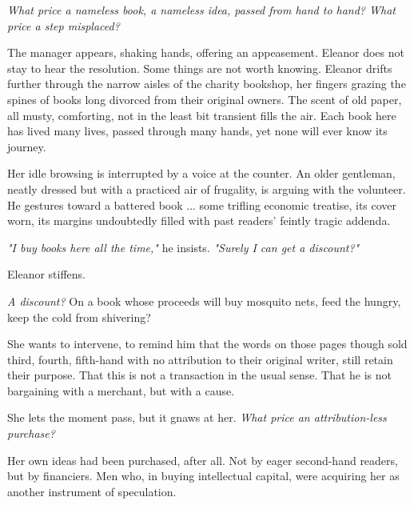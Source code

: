 \smallskip

\textit{What price a nameless book, a nameless idea, passed from hand to hand? What price a step misplaced?}

\smallskip

The manager appears, shaking hands, offering an appeasement. Eleanor does not stay to hear the resolution. Some things are not worth knowing. Eleanor drifts further through the narrow aisles of the charity bookshop, her fingers grazing the spines of books long divorced from their original owners. The scent of old paper, all musty, comforting, not in the least bit transient fills the air. Each book here has lived many lives, passed through many hands, yet none will ever know its journey.

\smallskip

Her idle browsing is interrupted by a voice at the counter. An older gentleman, neatly dressed but with a practiced air of frugality, is arguing with the volunteer. He gestures toward a battered book ... some trifling economic treatise, its cover worn, its margins undoubtedly filled with past readers’ feintly tragic addenda.

\smallskip

\textit{"I buy books here all the time,"} he insists. \textit{"Surely I can get a discount?"}

\smallskip

Eleanor stiffens.

\smallskip

\textit{A discount?} On a book whose proceeds will buy mosquito nets, feed the hungry, keep the cold from shivering?

\smallskip

She wants to intervene, to remind him that the words on those pages though sold third, fourth, fifth-hand with no attribution to their original writer, still retain their purpose. That this is not a transaction in the usual sense. That he is not bargaining with a merchant, but with a cause.

\smallskip

She lets the moment pass, but it gnaws at her. \textit{What price an attribution-less purchase?}

\smallskip

Her own ideas had been purchased, after all. Not by eager second-hand readers, but by financiers. Men who, in buying intellectual capital, were acquiring her as another instrument of speculation.

\smallskip

